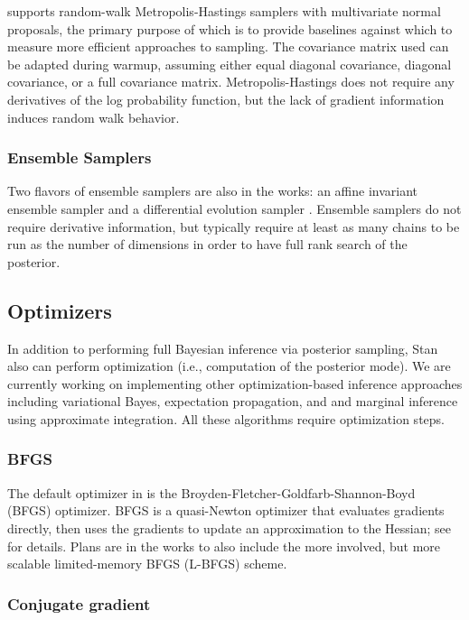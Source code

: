 \documentclass[article]{jss}
\begin{document}
 supports random-walk Metropolis-Hastings samplers with
multivariate normal proposals, the primary purpose of which is to
provide baselines against which to measure more efficient approaches
to sampling.  The covariance matrix used can be adapted during warmup,
assuming either equal diagonal covariance, diagonal covariance, or a
full covariance matrix.  Metropolis-Hastings does not require any
derivatives of the log probability function, but the lack of gradient
information induces random walk behavior.


\subsubsection{Ensemble Samplers}

Two flavors of ensemble samplers are also in the works: an affine invariant
ensemble sampler \citep{GoodmanWeare:2010} and a differential
evolution sampler \cite{TerBraak:2006}.  Ensemble samplers do not
require derivative information, but typically require at least as many
chains to be run as the number of dimensions in order to have full
rank search of the posterior.

\subsection{Optimizers}

In addition to performing full Bayesian inference via posterior
sampling, Stan also can perform optimization (i.e., computation of the
posterior mode).  We are currently working on implementing other
optimization-based inference approaches including variational Bayes,
expectation propagation, and and marginal inference using approximate
integration.  All these algorithms require optimization steps.

\subsubsection{BFGS}

The default optimizer in  is the
Broyden-Fletcher-Goldfarb-Shannon-Boyd (BFGS) optimizer.  BFGS is a
quasi-Newton optimizer that evaluates gradients directly, then uses
the gradients to update an approximation to the Hessian; see
\citep{NocedalWright:2006} for details.  Plans are in the works to
also include the more involved, but more scalable limited-memory BFGS
(L-BFGS) scheme.

\subsubsection{Conjugate gradient}
\end{document}
